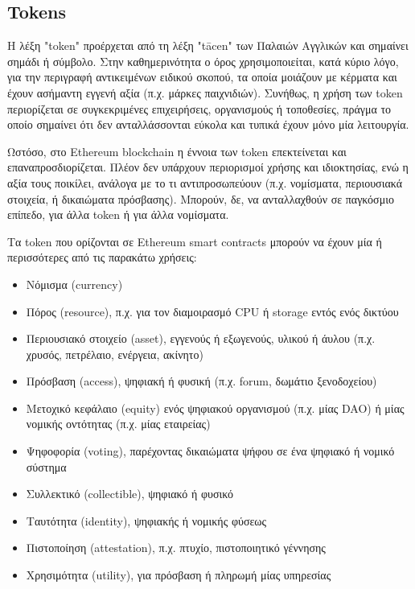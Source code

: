 \subsection{Tokens}

Η λέξη "token" προέρχεται από τη λέξη "tācen" των Παλαιών Αγγλικών και σημαίνει σημάδι ή
σύμβολο. Στην καθημερινότητα ο όρος χρησιμοποιείται, κατά κύριο λόγο, για την περιγραφή αντικειμένων ειδικού σκοπού, τα οποία μοιάζουν με κέρματα και έχουν ασήμαντη εγγενή αξία (π.χ. μάρκες παιχνιδιών). Συνήθως, η χρήση των token περιορίζεται σε συγκεκριμένες επιχειρήσεις, οργανισμούς ή τοποθεσίες, πράγμα το οποίο σημαίνει ότι δεν ανταλλάσσονται εύκολα και τυπικά έχουν μόνο μία λειτουργία.\cite{2.6-ethereum-mastering}

Ωστόσο, στο Ethereum blockchain η έννοια των token επεκτείνεται και επαναπροσδιορίζεται. Πλέον δεν υπάρχουν περιορισμοί χρήσης και ιδιοκτησίας, ενώ η αξία τους ποικίλει, ανάλογα με το τι αντιπροσωπεύουν (π.χ. νομίσματα, περιουσιακά στοιχεία, ή δικαιώματα πρόσβασης). Μπορούν, δε, να ανταλλαχθούν σε παγκόσμιο επίπεδο, για άλλα token ή για άλλα νομίσματα.

Τα token που ορίζονται σε Ethereum smart contracts μπορούν να έχουν μία ή περισσότερες από τις παρακάτω χρήσεις:

\begin{itemize}
	\item Νόμισμα (currency)
	\item Πόρος (resource), π.χ. για τον διαμοιρασμό CPU ή storage εντός ενός δικτύου
	\item Περιουσιακό στοιχείο (asset), εγγενούς ή εξωγενούς, υλικού
ή άυλου (π.χ. χρυσός, πετρέλαιο, ενέργεια, ακίνητο)
	\item Πρόσβαση (access), ψηφιακή ή
φυσική (π.χ. forum, δωμάτιο ξενοδοχείου)
	\item Μετοχικό κεφάλαιο (equity) ενός ψηφιακού οργανισμού (π.χ. μίας DAO) ή μίας νομικής οντότητας (π.χ. μίας εταιρείας)
	\item Ψηφοφορία (voting), παρέχοντας δικαιώματα ψήφου σε ένα ψηφιακό ή νομικό σύστημα
	\item Συλλεκτικό (collectible), ψηφιακό ή φυσικό
	\item Ταυτότητα (identity), ψηφιακής ή νομικής φύσεως
	\item Πιστοποίηση (attestation), π.χ. πτυχίο, πιστοποιητικό γέννησης
	\item Χρησιμότητα (utility), για πρόσβαση ή πληρωμή μίας υπηρεσίας
\end{itemize}

